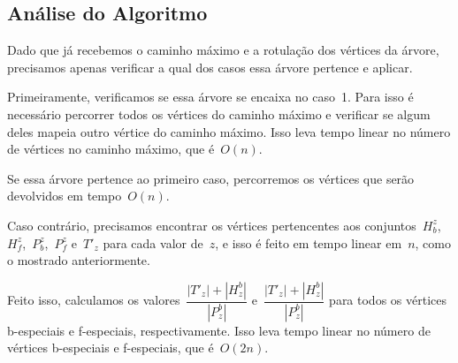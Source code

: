 	\subsection*{Análise do Algoritmo}
	Dado que já recebemos o caminho máximo e a rotulação dos vértices
	da árvore, precisamos apenas verificar a qual dos casos essa árvore
	pertence e aplicar.

	Primeiramente, verificamos se essa árvore se encaixa no caso~1.
	Para isso é necessário percorrer todos os vértices do caminho máximo
	e verificar se algum deles mapeia outro vértice do caminho máximo.
	Isso leva tempo linear no número de vértices no caminho máximo, que
	é~$O(n)$.

	Se essa árvore pertence ao primeiro caso, percorremos os vértices que
	serão devolvidos em tempo~$O(n)$.

	Caso contrário, precisamos encontrar os vértices pertencentes aos 
	conjuntos~$H_b^z$,~$H_f^z$,~$P_b^z$,~$P_f^z$ e~$T'_z$
	para cada valor de~$z$,
	e isso é feito em tempo linear em~$n$, como o mostrado anteriormente.


	Feito isso, calculamos os 
	valores~${\dfrac{|T'_{z}|+|H_{z}^b|}{|P^b_{z}|}}$
	e~${\dfrac{|T'_{z}|+|H_{z}^b|}{|P^b_{z}|}}$
	para todos os vértices b-especiais e f-especiais, respectivamente.
	Isso leva tempo linear no número de vértices b-especiais e f-especiais,
	que é~$O(2n)$.

	

